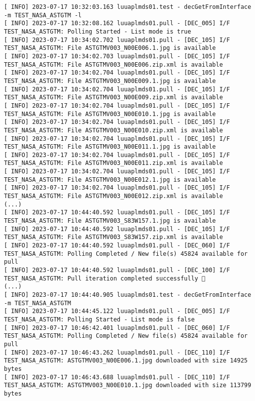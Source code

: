 \documentclass[dec_sum_main.tex]{subfiles}
\begin{document}
\begin{Verbatim}[fontsize=\tiny]
[ INFO] 2023-07-17 10:32:03.163 luuaplmds01.test - decGetFromInterface -m TEST_NASA_ASTGTM -l
[ INFO] 2023-07-17 10:32:08.162 luuaplmds01.pull - [DEC_005] I/F TEST_NASA_ASTGTM: Polling Started - List mode is true
[ INFO] 2023-07-17 10:34:02.702 luuaplmds01.pull - [DEC_105] I/F TEST_NASA_ASTGTM: File ASTGTMV003_N00E006.1.jpg is available
[ INFO] 2023-07-17 10:34:02.703 luuaplmds01.pull - [DEC_105] I/F TEST_NASA_ASTGTM: File ASTGTMV003_N00E006.zip.xml is available
[ INFO] 2023-07-17 10:34:02.704 luuaplmds01.pull - [DEC_105] I/F TEST_NASA_ASTGTM: File ASTGTMV003_N00E009.1.jpg is available
[ INFO] 2023-07-17 10:34:02.704 luuaplmds01.pull - [DEC_105] I/F TEST_NASA_ASTGTM: File ASTGTMV003_N00E009.zip.xml is available
[ INFO] 2023-07-17 10:34:02.704 luuaplmds01.pull - [DEC_105] I/F TEST_NASA_ASTGTM: File ASTGTMV003_N00E010.1.jpg is available
[ INFO] 2023-07-17 10:34:02.704 luuaplmds01.pull - [DEC_105] I/F TEST_NASA_ASTGTM: File ASTGTMV003_N00E010.zip.xml is available
[ INFO] 2023-07-17 10:34:02.704 luuaplmds01.pull - [DEC_105] I/F TEST_NASA_ASTGTM: File ASTGTMV003_N00E011.1.jpg is available
[ INFO] 2023-07-17 10:34:02.704 luuaplmds01.pull - [DEC_105] I/F TEST_NASA_ASTGTM: File ASTGTMV003_N00E011.zip.xml is available
[ INFO] 2023-07-17 10:34:02.704 luuaplmds01.pull - [DEC_105] I/F TEST_NASA_ASTGTM: File ASTGTMV003_N00E012.1.jpg is available
[ INFO] 2023-07-17 10:34:02.704 luuaplmds01.pull - [DEC_105] I/F TEST_NASA_ASTGTM: File ASTGTMV003_N00E012.zip.xml is available
(...)
[ INFO] 2023-07-17 10:44:40.592 luuaplmds01.pull - [DEC_105] I/F TEST_NASA_ASTGTM: File ASTGTMV003_S83W157.1.jpg is available
[ INFO] 2023-07-17 10:44:40.592 luuaplmds01.pull - [DEC_105] I/F TEST_NASA_ASTGTM: File ASTGTMV003_S83W157.zip.xml is available
[ INFO] 2023-07-17 10:44:40.592 luuaplmds01.pull - [DEC_060] I/F TEST_NASA_ASTGTM: Polling Completed / New file(s) 45824 available for pull
[ INFO] 2023-07-17 10:44:40.592 luuaplmds01.pull - [DEC_100] I/F TEST_NASA_ASTGTM: Pull iteration completed successfully 🕺
(...)
[ INFO] 2023-07-17 10:44:40.905 luuaplmds01.test - decGetFromInterface -m TEST_NASA_ASTGTM
[ INFO] 2023-07-17 10:44:45.122 luuaplmds01.pull - [DEC_005] I/F TEST_NASA_ASTGTM: Polling Started - List mode is false
[ INFO] 2023-07-17 10:46:42.401 luuaplmds01.pull - [DEC_060] I/F TEST_NASA_ASTGTM: Polling Completed / New file(s) 45824 available for pull
[ INFO] 2023-07-17 10:46:43.262 luuaplmds01.pull - [DEC_110] I/F TEST_NASA_ASTGTM: ASTGTMV003_N00E006.1.jpg downloaded with size 14925 bytes
[ INFO] 2023-07-17 10:46:43.688 luuaplmds01.pull - [DEC_110] I/F TEST_NASA_ASTGTM: ASTGTMV003_N00E010.1.jpg downloaded with size 113799 bytes

\end{Verbatim}
\end{document}
